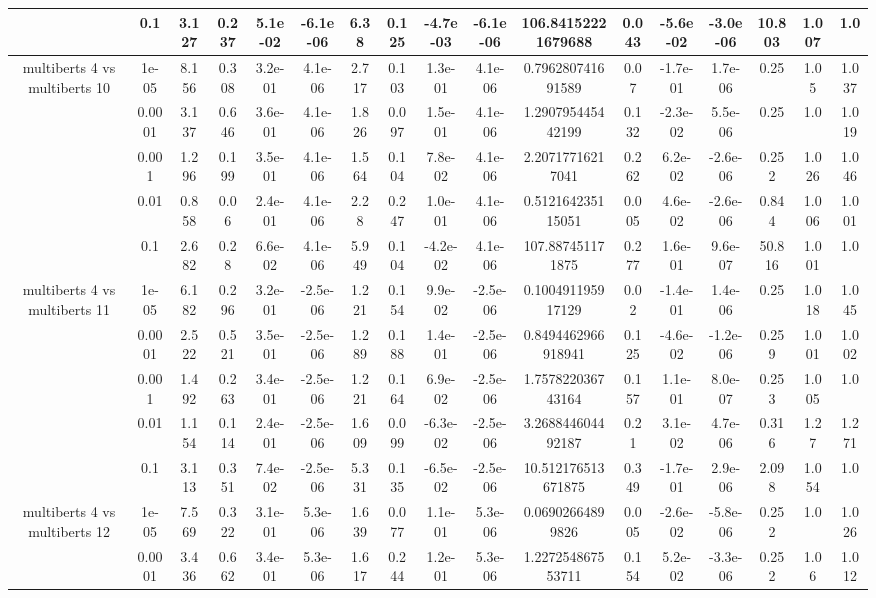 \begin{tabular}{|c|c|c|c|c|c|c|c|c|c|c|c|c|c|c|c|c|}
 & 0.1 & 3.127 & 0.237 & 5.1e-02 & -6.1e-06 & 6.38 & 0.125 & -4.7e-03 & -6.1e-06 & 106.84152221679688 & 0.043 & -5.6e-02 & -3.0e-06 & 10.803 & 1.007 & 1.0 \\
\hline
\multirow{5}{*}{multiberts 4 vs multiberts 10} & 1e-05 & 8.156 & 0.308 & 3.2e-01 & 4.1e-06 & 2.717 & 0.103 & 1.3e-01 & 4.1e-06 & 0.796280741691589 & 0.07 & -1.7e-01 & 1.7e-06 & 0.25 & 1.05 & 1.037 \\
 & 0.0001 & 3.137 & 0.646 & 3.6e-01 & 4.1e-06 & 1.826 & 0.097 & 1.5e-01 & 4.1e-06 & 1.290795445442199 & 0.132 & -2.3e-02 & 5.5e-06 & 0.25 & 1.0 & 1.019 \\
 & 0.001 & 1.296 & 0.199 & 3.5e-01 & 4.1e-06 & 1.564 & 0.104 & 7.8e-02 & 4.1e-06 & 2.20717716217041 & 0.262 & 6.2e-02 & -2.6e-06 & 0.252 & 1.026 & 1.046 \\
 & 0.01 & 0.858 & 0.06 & 2.4e-01 & 4.1e-06 & 2.28 & 0.247 & 1.0e-01 & 4.1e-06 & 0.512164235115051 & 0.005 & 4.6e-02 & -2.6e-06 & 0.844 & 1.006 & 1.001 \\
 & 0.1 & 2.682 & 0.28 & 6.6e-02 & 4.1e-06 & 5.949 & 0.104 & -4.2e-02 & 4.1e-06 & 107.887451171875 & 0.277 & 1.6e-01 & 9.6e-07 & 50.816 & 1.001 & 1.0 \\
\hline
\multirow{5}{*}{multiberts 4 vs multiberts 11} & 1e-05 & 6.182 & 0.296 & 3.2e-01 & -2.5e-06 & 1.221 & 0.154 & 9.9e-02 & -2.5e-06 & 0.100491195917129 & 0.02 & -1.4e-01 & 1.4e-06 & 0.25 & 1.018 & 1.045 \\
 & 0.0001 & 2.522 & 0.521 & 3.5e-01 & -2.5e-06 & 1.289 & 0.188 & 1.4e-01 & -2.5e-06 & 0.8494462966918941 & 0.125 & -4.6e-02 & -1.2e-06 & 0.259 & 1.001 & 1.002 \\
 & 0.001 & 1.492 & 0.263 & 3.4e-01 & -2.5e-06 & 1.221 & 0.164 & 6.9e-02 & -2.5e-06 & 1.757822036743164 & 0.157 & 1.1e-01 & 8.0e-07 & 0.253 & 1.005 & 1.0 \\
 & 0.01 & 1.154 & 0.114 & 2.4e-01 & -2.5e-06 & 1.609 & 0.099 & -6.3e-02 & -2.5e-06 & 3.268844604492187 & 0.21 & 3.1e-02 & 4.7e-06 & 0.316 & 1.27 & 1.271 \\
 & 0.1 & 3.113 & 0.351 & 7.4e-02 & -2.5e-06 & 5.331 & 0.135 & -6.5e-02 & -2.5e-06 & 10.512176513671875 & 0.349 & -1.7e-01 & 2.9e-06 & 2.098 & 1.054 & 1.0 \\
\hline
\multirow{5}{*}{multiberts 4 vs multiberts 12} & 1e-05 & 7.569 & 0.322 & 3.1e-01 & 5.3e-06 & 1.639 & 0.077 & 1.1e-01 & 5.3e-06 & 0.06902664899826 & 0.005 & -2.6e-02 & -5.8e-06 & 0.252 & 1.0 & 1.026 \\
 & 0.0001 & 3.436 & 0.662 & 3.4e-01 & 5.3e-06 & 1.617 & 0.244 & 1.2e-01 & 5.3e-06 & 1.227254867553711 & 0.154 & 5.2e-02 & -3.3e-06 & 0.252 & 1.06 & 1.012 \\

\end{tabular}
